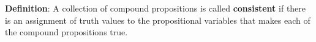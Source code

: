 
{\bf Definition}: A collection of  compound  propositions
is called {\bf consistent} if  there
is  an assignment  of  truth values
to  the  propositional variables that makes
each of the compound propositions  true.
